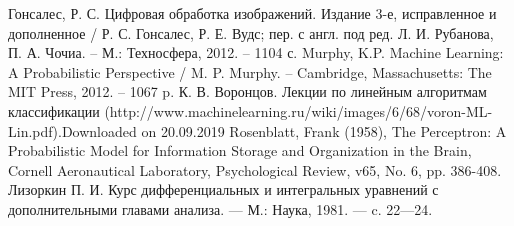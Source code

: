 \documentclass[main.tex]{subfiles}
\begin{document}
	\begin{thebibliography}{99}
		 Гонсалес, Р. С. Цифровая обработка изображений. Издание 3-е, исправленное и дополненное / Р. С. Гонсалес, Р. Е. Вудс; пер. с англ. под ред. Л. И. Рубанова, П. А. Чочиа. -- М.: Техносфера, 2012. -- 1104 с.
		 Murphy, K.P. Machine Learning: A Probabilistic Perspective / M. P. Murphy. -- Cambridge, Massachusetts: The MIT Press, 2012. -- 1067 p.
		 К. В. Воронцов. Лекции по линейным алгоритмам классификации (http://www.machinelearning.ru/wiki/images/6/68/voron-ML-Lin.pdf).Downloaded on 20.09.2019
		 Rosenblatt, Frank (1958), The Perceptron: A Probabilistic Model for Information Storage and Organization in the Brain, Cornell Aeronautical Laboratory, Psychological Review, v65, No. 6, pp. 386-408.
		 Лизоркин П. И. Курс дифференциальных и интегральных уравнений с дополнительными главами анализа. — М.: Наука, 1981. — c. 22—24.
	\end{thebibliography}
\end{document}
